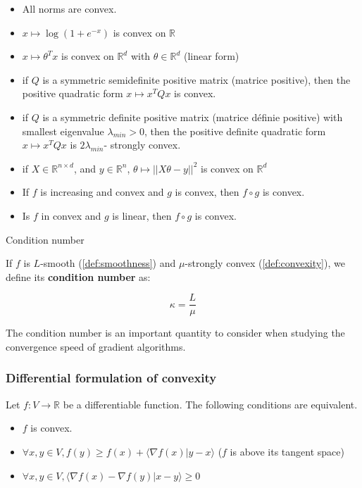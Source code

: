\documentclass[
10pt, %
a4paper, %
oneside, %
headinclude,footinclude, %
BCOR5mm, %
]{scrartcl}
\begin{document}
\begin{itemize}
    \item All norms are convex.
    \item $x\mapsto \log(1+e^{-x})$ is convex on $ \mathbb{R} $
    \item $x\mapsto \theta^Tx$ is convex on $ \mathbb{R}^d$ with $\theta \in \mathbb{R}^d$ (linear form)
    \item if $Q$ is a symmetric semidefinite positive matrix (matrice positive), then the positive quadratic form $x\mapsto x^TQx$ is convex.
    \item if $Q$ is a symmetric definite positive matrix (matrice définie positive) with smallest eigenvalue $\lambda_{min}>0$, then the positive definite quadratic form $x\mapsto x^TQx$ is $ 2\lambda_{min}$- strongly convex.
    \item if $X\in \mathbb{R}^{n\times d}$, and $y\in \mathbb{R}^n$, $\theta\mapsto ||X\theta-y||^2$ is convex on $ \mathbb{R}^d$
    \item If $f$ is increasing and convex and $g$ is convex, then $f \circ g $ is convex.
    \item Is $f$ in convex and $g$ is linear, then $f \circ g $ is convex.
\end{itemize}

\begin{definition}{Condition number}

    If $f$ is $L$-smooth (\ref{def:smoothness}) and $\mu$-strongly convex (\ref{def:convexity}), we define its \textbf{{condition number}} as:

    \begin{equation*}
        \kappa = \frac{L}{\mu} 
    \end{equation*}

\end{definition}

\begin{remark}
    The condition number is an important quantity to consider when studying the convergence speed of gradient algorithms.
\end{remark}


\subsubsection{\large\color{Periwinkle}Differential formulation of convexity}

\begin{proposition}
    \label{prop:conv}
    Let $f:V \rightarrow \mathbb{R} $ be a differentiable function. The following conditions are equivalent.
    \begin{itemize}
        \item $f$ is convex.
	\item $\forall x, y\in V, f(y)\geq f(x)+\langle\nabla f(x)|y-x\rangle$ ($f$ is above its tangent space)
	\item $\forall x, y\in V, \langle \nabla f(x)-\nabla f(y)|x-y\rangle\geq 0$
    \end{itemize}
\end{proposition}
\end{document}
